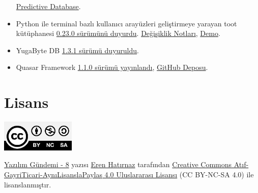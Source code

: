 \documentclass[11pt]{article}
\begin{document}
\begin{itemize}
\href{https://aito.ai/blog/introducing-a-new-database-category-the-predictive-database/}{Predictive Database}.
\item Python ile terminal bazlı kullanıcı arayüzleri geliştirmeye yarayan toot
kütüphanesi \href{https://github.com/ihabunek/toot/releases/tag/0.23.0}{0.23.0 sürümünü duyurdu}. \href{https://github.com/ihabunek/toot/blob/master/CHANGELOG.md}{Değişiklik Notları}, \href{https://asciinema.org/a/fTq6pzFOIrPzaIt1ralRM86wE}{Demo}.
\item YugaByte DB \href{https://jepsen.io/analyses/yugabyte-db-1.3.1}{1.3.1 sürümü duyuruldu}.
\item Quasar Framework \href{https://forum.quasar-framework.org/topic/4234/quasar-1-1-0-released-new-component-qvirtualscroll-many-other-new-things-a-lot-of-improvements-and-fixes/2}{1.1.0 sürümü yayınlandı}, \href{https://github.com/quasarframework/quasar}{GitHub Deposu}.
\end{itemize}
\section{Lisans}
\label{sec:orgf2414b1}
\begin{center}
\begin{center}
\includegraphics[height=1.5cm]{../../../img/CC_BY-NC-SA_4.0.png}
\end{center}

\href{yazilim-gundemi-08.pdf}{Yazılım Gündemi - 8} yazısı \href{https://erenhatirnaz.github.io}{Eren Hatırnaz} tarafından \href{http://creativecommons.org/licenses/by-nc-sa/4.0/}{Creative Commons
Atıf-GayriTicari-AynıLisanslaPaylaş 4.0 Uluslararası Lisansı} (CC BY-NC-SA 4.0)
ile lisanslanmıştır.
\end{center}
\end{document}
